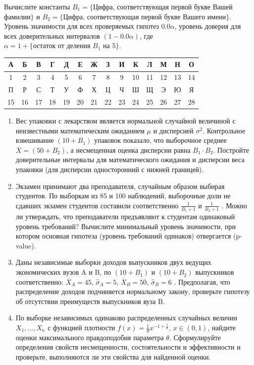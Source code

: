 \documentclass[12pt, a4paper]{article}\usepackage[]{graphicx}\usepackage[]{color}
\begin{document}
				Вычислите константы $B_1=\{\text{Цифра, соответствующая первой букве}$
				Вашей\\ фамилии$\}$ и $B_2=\{\text{Цифра, соответствующая первой букве}$
				Вашего имени$\}$.\\
				Уровень значимости для всех проверяемых гипотез $0.0\alpha$, уровень доверия для всех доверительных интервалов $(1-0.0\alpha)$, где  $\alpha =1+ \{\text{остаток от деления } B_1 \text{ на }  5\}$.\\

				\begin{center}
					\begin{tabular}{|c|c|c|c|c|c|c|c|c|c|c|c|c|c|}
						\hline  А & Б & В & Г & Д & Е & Ж & З & И & К & Л & М & Н & О \\
						\hline 1 & 2 & 3 & 4 & 5 & 6 & 7 & 8 & 9 & 10 & 11 & 12 & 13 & 14 \\
						\hline  П & Р & С & Т & У & Ф & Х & Ц & Ч & Ш & Щ & Э & Ю & Я \\
						\hline 15& 16  &  17 &  18&  19&  20&  21& 22 & 23 &  24& 25 & 26  &  27 & 28 \\
						\hline
					\end{tabular}
				\end{center}
				\begin{enumerate}
					\item Вес упаковки с лекарством является нормальной случайной величиной с неизвестными математическим ожиданием  $\mu$ и дисперсией $\sigma^2$. Контрольное взвешивание $(10+B_1)$ упаковок показало, что выборочное среднее  $\overline{X} = (50+B_2)$, а  несмещенная оценка дисперсии равна $B_1\cdot B_2$. Постройте  доверительные интервалы для математического ожидания и дисперсии веса упаковки (для дисперсии односторонний с нижней границей).

					\item Экзамен принимают два преподавателя, случайным образом выбирая студентов.  По выборкам из 85 и 100 наблюдений, выборочные доли не сдавших экзамен студентов составили соответственно $\frac{1}{B_1+1}$ и $\frac{1}{B_2+1}$ . Можно ли утверждать, что преподаватели предъявляют к студентам одинаковый уровень требований? Вычислите минимальный уровень значимости, при котором основная гипотеза (уровень требований одинаков) отвергается (p-value).

					\item Даны независимые выборки доходов выпускников двух ведущих экономических вузов A и B, по $(10+B_1)$ и $(10+B_2)$ выпускников соответственно: $\overline{X}_A=45$, $\hat{\sigma}_A=5$, $\overline{X}_B=50$, $\hat{\sigma}_B=6$ .
					Предполагая, что распределение доходов подчиняется нормальному закону, проверьте гипотезу об отсутствии преимуществ выпускников вуза B.

					\item 	По выборке независимых одинаково распределенных случайных величин\\ $X_1,\dots,X_n$ с функцией плотности $f(x)=\frac{1}{\theta} x^{-1+\frac{1}{\theta}}$, $x\in(0, 1)$, найдите оценки максимального правдоподобия параметра $\theta$. Сформулируйте определения свойств несмещенности, состоятельности и эффективности и проверьте, выполняются ли эти свойства для найденной оценки.
				\end{enumerate}
\end{document}
